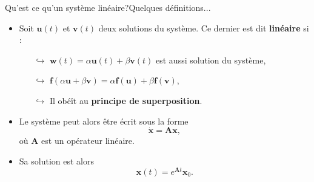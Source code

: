 \documentclass[usenames,dvipsnames,svgnames,10pt,aspectratio=169]{beamer}
\begin{document}
\begin{frame}[t, c]{Qu'est ce qu'un système linéaire?}{Quelques définitions...}

	\begin{itemize}
		\item 	Soit ${\bm u}(t)$ et ${\bm v}(t)$ deux solutions du système. Ce dernier est dit \alert{\textbf{linéaire}} si :
			\medskip
			\begin{itemize}
				\item[$\hookrightarrow$] ${\bm w}(t) = \alpha {\bm u}(t) + \beta {\bm v}(t)$ est aussi solution du système,
				\medskip
				\item[$\hookrightarrow$] ${\bm f}(\alpha {\bm u} + \beta {\bm v}) = \alpha {\bm f}({\bm u})  + \beta {\bm f}({\bm v})$,
				\medskip
				\item[$\hookrightarrow$] Il obéît au \alert{\textbf{principe de superposition}}.
			\end{itemize}

		\medskip

		\item Le système peut alors être écrit sous la forme
			$$ \dot{\bm x} = {\bm A}{\bm x},$$
			où ${\bm A}$ est un opérateur linéaire.

		\medskip

		\item Sa solution est alors
		$${\bm x}(t) = e^{{\bm A}t} {\bm x}_0.$$
	\end{itemize}

	\vspace{1cm}
\end{frame}
\end{document}
